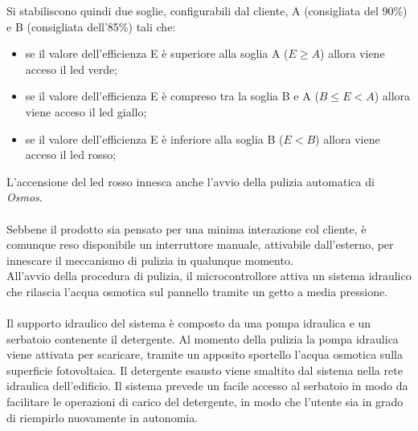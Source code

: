 \documentclass[a4paper, 12pt]{article}
\begin{document}
	Si stabiliscono quindi due soglie, configurabili dal cliente, A (consigliata del 90\%) e B (consigliata dell'85\%) tali che:
	\begin{itemize}
		\item se il valore dell'efficienza E è superiore alla soglia A ($E \ge A$) allora viene acceso il led verde;
		\item se il valore dell'efficienza E è compreso tra la soglia B e A ($B \le E < A$) allora viene acceso il led giallo;
		\item se il valore dell'efficienza E è inferiore alla soglia B ($E < B$) allora viene acceso il led rosso;
	\end{itemize}
	L'accensione del led rosso innesca anche l'avvio della pulizia automatica di \emph{Osmos}.\\\\
	Sebbene il prodotto sia pensato per una minima interazione col cliente, è comunque reso disponibile un interruttore manuale, attivabile dall'esterno, per innescare il meccanismo di pulizia in qualunque momento.\\
	All'avvio della procedura di pulizia, il microcontrollore attiva un sistema idraulico che rilascia l'acqua osmotica sul pannello tramite un getto a media pressione.\\\\
	Il supporto idraulico del sistema è composto da una pompa idraulica e un serbatoio contenente il detergente. Al momento della pulizia la pompa idraulica viene attivata per scaricare, tramite un apposito sportello l'acqua osmotica sulla superficie fotovoltaica. Il detergente esausto viene smaltito dal sistema nella rete idraulica dell'edificio.
	Il sistema prevede un facile accesso al serbatoio in modo da facilitare le operazioni di carico del detergente, in modo che l'utente sia in grado di riempirlo nuovamente in autonomia.
\end{document}
